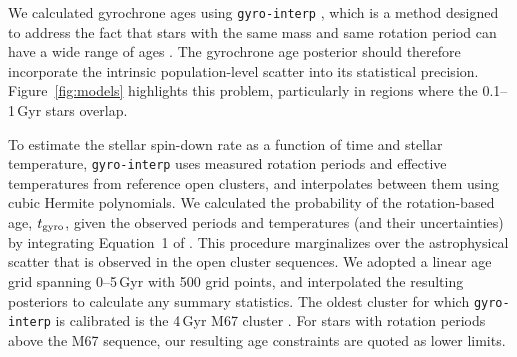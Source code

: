 \documentclass[11pt,twocolumn,tighten]{aastex63}
\begin{document}
We calculated gyrochrone ages using \texttt{gyro-interp}
\citep[][]{Bouma_2023}, which is a method designed to address the fact
that stars with the same mass and same rotation period can have a wide
range of ages \citep[e.g.][]{Gallet_Bouvier_2015}.  The gyrochrone age
posterior should therefore incorporate the intrinsic population-level
scatter into its statistical precision.  Figure~\ref{fig:models}
highlights this problem, particularly in regions where the 0.1--1\,Gyr
stars overlap.

To estimate the stellar spin-down rate as a function of time and
stellar temperature, \texttt{gyro-interp} uses measured rotation
periods and effective temperatures from reference open clusters, and
interpolates between them using cubic Hermite polynomials.  We
calculated the probability of the rotation-based age, $t_{\rm gyro}$,
given the observed periods and temperatures (and their uncertainties)
by integrating Equation~1 of \citet{Bouma_2023}.  This procedure
marginalizes over the astrophysical scatter that is observed in the
open cluster sequences.  We adopted a linear age grid spanning
0--5\,Gyr with 500 grid points, and interpolated the resulting
posteriors to calculate any summary statistics.  The oldest cluster
for which \texttt{gyro-interp} is calibrated is the 4\,Gyr M67 cluster
\citep[][]{Dungee_2022,Gruner_2023}.  For stars with rotation
periods above the M67 sequence, our resulting age constraints are quoted as lower limits.

	
\end{document}
